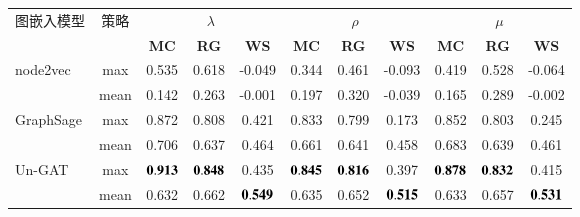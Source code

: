 \begin{table*}[htbp]
    \center
    \vspace{5pt}
    \begin{tabular}{|l|c|c|c|c|c|c|c|c|c|c|}
    \hline
    \multirow{2}{*}{图嵌入模型}     & \multirow{2}{*}{策略} & \multicolumn{3}{c|}{$\lambda$} & \multicolumn{3}{c|}{$\rho$} & \multicolumn{3}{c|}{$\mu$} \\ \cline{3-11} 
     &
       &
      \multicolumn{1}{c|}{\textbf{MC}} &
      \multicolumn{1}{c|}{\textbf{RG}} &
      \multicolumn{1}{c|}{\textbf{WS}} &
      \multicolumn{1}{c|}{\textbf{MC}} &
      \multicolumn{1}{c|}{\textbf{RG}} &
      \multicolumn{1}{c|}{\textbf{WS}} &
      \multicolumn{1}{c|}{\textbf{MC}} &
      \multicolumn{1}{c|}{\textbf{RG}} &
      \multicolumn{1}{c|}{\textbf{WS}} \\ \hline
    \multirow{2}{*}{node2vec} &
      max &
      \multicolumn{1}{c|}{0.535} &
      \multicolumn{1}{c|}{0.618} &
      \multicolumn{1}{c|}{-0.049} &
      \multicolumn{1}{c|}{0.344} &
      \multicolumn{1}{c|}{0.461} &
      \multicolumn{1}{c|}{-0.093} &
      \multicolumn{1}{c|}{0.419} &
      \multicolumn{1}{c|}{0.528} &
      \multicolumn{1}{c|}{-0.064} \\ \cline{2-11} 
                               & mean & 0.142 & 0.263 & -0.001 & 0.197 & 0.320 & -0.039 & 0.165 & 0.289 & -0.002 \\ \hline
    \multirow{2}{*}{GraphSage} & max  & 0.872 & 0.808 & 0.421 & 0.833 & 0.799 & 0.173 & 0.852 & 0.803 & 0.245 \\ \cline{2-11} 
                               & mean & 0.706 & 0.637 & 0.464 & 0.661 & 0.641 & 0.458 & 0.683  & 0.639 & 0.461 \\ \hline
    \multirow{2}{*}{Un-GAT}       & max  & $\bf 0.913$ & $\bf 0.848$ & 0.435 & $\bf 0.845$ & $\bf 0.816$ & 0.397 & $\bf 0.878$  & $\bf 0.832$ & 0.415 \\ \cline{2-11} 
                               & mean & 0.632 & 0.662 & $\bf 0.549$ & 0.635 & 0.652 & $\bf 0.515$ & 0.633 & 0.657 & $\bf 0.531$ \\ \hline
    \end{tabular}
    \label{table5-5}
\end{table*}



